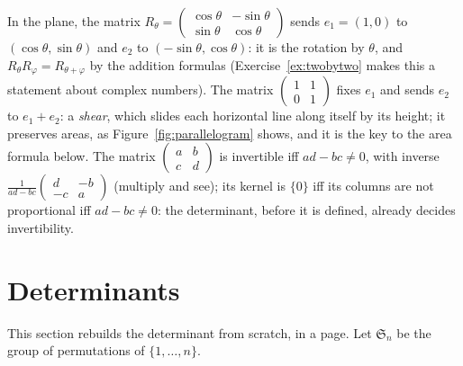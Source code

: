 \begin{examplex}
In the plane, the matrix $R_\theta=\begin{pmatrix}\cos\theta&-\sin\theta\\ \sin\theta&\cos\theta\end{pmatrix}$ sends $e_1=(1,0)$ to $(\cos\theta,\sin\theta)$ and $e_2$ to $(-\sin\theta,\cos\theta)$: it is the rotation by $\theta$, and $R_\theta R_\varphi=R_{\theta+\varphi}$ by the addition formulas (Exercise~\ref{ex:twobytwo} makes this a statement about complex numbers). The matrix $\begin{pmatrix}1&1\\0&1\end{pmatrix}$ fixes $e_1$ and sends $e_2$ to $e_1+e_2$: a \emph{shear}, which slides each horizontal line along itself by its height; it preserves areas, as Figure~\ref{fig:parallelogram} shows, and it is the key to the area formula below. The matrix $\begin{pmatrix}a&b\\c&d\end{pmatrix}$ is invertible iff $ad-bc\ne0$, with inverse $\frac1{ad-bc}\begin{pmatrix}d&-b\\-c&a\end{pmatrix}$ (multiply and see); its kernel is $\{0\}$ iff its columns are not proportional iff $ad-bc\ne0$: the determinant, before it is defined, already decides invertibility.
\end{examplex}

\section{Determinants}

This section rebuilds the determinant from scratch, in a page. Let $\mathfrak S_n$ be the group of permutations of $\{1,\dots,n\}$.

